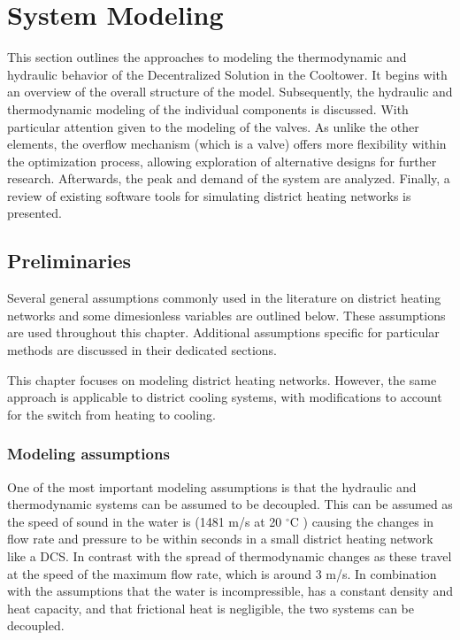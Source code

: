 \chapter{System Modeling}\label{chap::sysmodel}
This section outlines the approaches to modeling the thermodynamic and hydraulic behavior of the Decentralized Solution in the Cooltower. It begins with an overview of the overall structure of the model. Subsequently, the hydraulic and thermodynamic modeling of the individual components is discussed. With particular attention given to the modeling of the valves. As unlike the other elements, the overflow mechanism (which is a valve) offers more flexibility within the optimization process, allowing exploration of alternative designs for further research. Afterwards, the peak and demand of the system are analyzed. Finally, a review of existing software tools for simulating district heating networks is presented. 

\section{Preliminaries}\label{sec::preliminaries}
Several general assumptions commonly used in the literature on  district heating networks and some dimesionless variables are outlined below. These assumptions are used throughout this chapter. Additional assumptions specific for particular methods are discussed in their dedicated sections.

This chapter focuses on modeling district heating networks. However, the same approach is applicable to district cooling systems, with modifications to account for the switch from heating to cooling.

\subsection{Modeling assumptions}
One of the most important modeling assumptions is that the hydraulic and thermodynamic systems can be assumed to be decoupled. This can be assumed as the speed of sound in the water is (1481 m/s at 20 $^{\circ}\text{C}$ \cite{speedofsound}) causing the changes in flow rate and pressure to be within seconds in a small district heating network like a DCS. In contrast with the spread of thermodynamic changes as these travel at the speed of the maximum flow rate, which is around 3 m/s. In combination with the assumptions that the water is incompressible, has a constant density and heat capacity, and that frictional heat is negligible, the two systems can be decoupled. 

